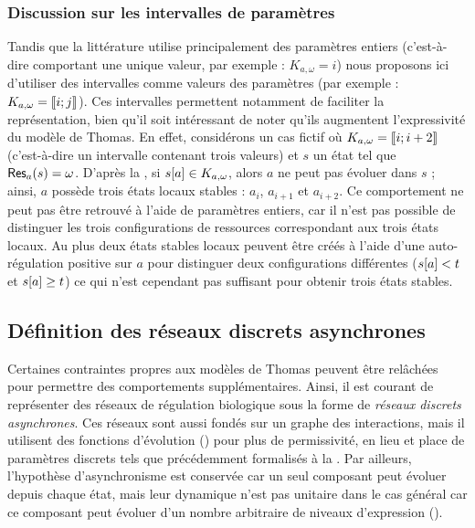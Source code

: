 
\subsubsection*{Discussion sur les intervalles de paramètres}
Tandis que la littérature utilise principalement des paramètres entiers
(c'est-à-dire comportant une unique valeur, par exemple : $K_{a,\omega} = i$)
nous proposons ici d'utiliser des intervalles comme valeurs des paramètres
(par exemple : $K_{a,\omega} = \mathopen{\llbracket}i\mathclose{};j\mathclose{\rrbracket}$).
Ces intervalles permettent notamment de faciliter la représentation,
bien qu'il soit intéressant de noter qu'ils augmentent l'expressivité du modèle de Thomas.
En effet, considérons un cas fictif où $K_{a,\omega} = \mathopen{\llbracket}i\mathclose{};i+2\mathclose{\rrbracket}$
(c'est-à-dire un intervalle contenant trois valeurs) et $s$ un état tel que
$\mathsf{Res}_{a}(s) = \omega$.
D'après la , si ${s[a]} \in K_{a,\omega}$, alors $a$
ne peut pas évoluer dans $s$ ; ainsi, $a$ possède trois états locaux stables :
$a_i$, $a_{i+1}$ et $a_{i+2}$.
Ce comportement ne peut pas être retrouvé à l'aide de paramètres entiers,
car il n'est pas possible de distinguer les trois configurations de ressources
correspondant aux trois états locaux.
Au plus deux états stables locaux peuvent être créés à l'aide d'une auto-régulation positive
sur $a$ pour distinguer deux configurations différentes
(${s[a]} < t$ et ${s[a]} \geq t$)
ce qui n'est cependant pas suffisant pour obtenir trois états stables.



\subsection{Définition des réseaux discrets asynchrones}

Certaines contraintes propres aux modèles de Thomas peuvent être relâchées pour permettre
des comportements supplémentaires.
Ainsi, il est courant de représenter des réseaux de régulation biologique
sous la forme de \emph{réseaux discrets asynchrones}.
Ces réseaux sont aussi fondés sur un graphe des interactions,
mais il utilisent des fonctions d'évolution () pour plus de permissivité,
en lieu et place de paramètres discrets tels que précédemment
formalisés à la .
Par ailleurs, l'hypothèse d'asynchronisme est conservée car un seul composant peut évoluer
depuis chaque état,
mais leur dynamique n'est pas unitaire dans le cas général
car ce composant peut évoluer d'un nombre arbitraire de niveaux d'expression
().

